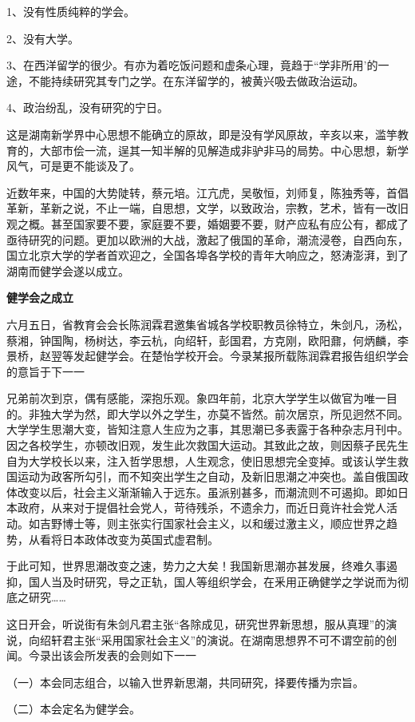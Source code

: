 1、没有性质纯粹的学会。

2、没有大学。

3、在西洋留学的很少。有亦为着吃饭问题和虚条心理，竟趋于“学非所用’的一途，不能持续研究其专门之学。在东洋留学的，被黄兴吸去做政治运动。

4、政治纷乱，没有研究的宁日。

这是湖南新学界中心思想不能确立的原故，即是没有学风原故，辛亥以来，滥竽教育的，大部市侩一流，逞其一知半解的见解造成非驴非马的局势。中心思想，新学风气，可是更不能谈及了。

近数年来，中国的大势陡转，蔡元培。江亢虎，吴敬恒，刘师复，陈独秀等，首倡革新，革新之说，不止一端，自思想，文学，以致政治，宗教，艺术，皆有一改旧观之概。甚至国家要不要，家庭要不要，婚姻要不要，财产应私有应公有，都成了亟待研究的问题。更加以欧洲的大战，激起了俄国的革命，潮流浸卷，自西向东，国立北京大学的学者首欢迎之，全国各埠各学校的青年大响应之，怒涛澎湃，到了湖南而健学会遂以成立。

\textbf{健学会之成立}

六月五日，省教育会会长陈润霖君邀集省城各学校职教员徐特立，朱剑凡，汤松，蔡湘，钟国陶，杨树达，李云杭，向绍轩，彭国君，方克刚，欧阳鼐，何炳麟，李景桥，赵翌等发起健学会。在楚怡学校开会。今录某报所载陈润霖君报告组织学会的意旨于下一一

兄弟前次到京，偶有感能，深抱乐观。象四年前，北京大学学生以做官为唯一目的。非独大学为然，即大学以外之学生，亦莫不皆然。前次居京，所见迥然不同。大学学生思潮大变，皆知注意人生应为之事，其思潮已多表露于各种杂志月刊中。因之各校学生，亦顿改旧观，发生此次救国大运动。其致此之故，则因蔡孑民先生自为大学校长以来，注入哲学思想，人生观念，使旧思想完全变掉。或该认学生救国运动为政客所勾引，而不知突出学生之自动，及新旧思潮之冲突也。盖自俄国政体改变以后，社会主义渐渐输入于远东。虽派别甚多，而潮流则不可遏抑。即如日本政府，从来对于提倡社会党人，苛待残杀，不遗余力，而近日竟许社会党人活动。如吉野博士等，则主张实行国家社会主义，以和缓过激主义，顺应世界之趋势，从看将日本政体改变为英国式虚君制。

于此可知，世界思潮改变之速，势力之大矣！我国新思潮亦甚发展，终难久事遏抑，国人当及时研究，导之正轨，国人等组织学会，在釆用正确健学之学说而为彻底之研究……

这日开会，听说街有朱剑凡君主张“各除成见，研究世界新思想，服从真理”的演说，向绍轩君主张“采用国家社会主义”的演说。在湖南思想界不可不谓空前的创闻。今录出该会所发表的会则如下一一

（一）本会同志组合，以输入世界新思潮，共同研究，择要传播为宗旨。

（二）本会定名为健学会。

